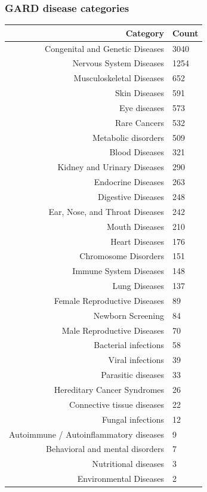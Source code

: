 ﻿\documentclass[anchorcolor=blue,linkcolor=blue]{beamer}
\begin{document}
\begin{frame}
  \frametitle{GARD disease categories}
  \begin{center}
    \tiny
    \begin{tabular}{rl}\toprule
      Category & Count\\ \midrule
      Congenital and Genetic Diseases&3040\\
      Nervous System Diseases&1254\\
      Musculoskeletal Diseases&652\\
      Skin Diseases&591\\
      Eye diseases&573\\
      Rare Cancers&532\\
      Metabolic disorders&509\\
      Blood Diseases&321\\
      Kidney and Urinary Diseases&290\\
      Endocrine Diseases&263\\
      Digestive Diseases&248\\
      Ear, Nose, and Throat Diseases&242\\
      Mouth Diseases&210\\
      Heart Diseases&176\\
      Chromosome Disorders&151\\
      Immune System Diseases&148\\
      Lung Diseases&137\\
      Female Reproductive Diseases&89\\
      Newborn Screening&84\\
      Male Reproductive Diseases&70\\
      Bacterial infections&58\\
      Viral infections&39\\
      Parasitic diseases&33\\
      Hereditary Cancer Syndromes&26\\
      Connective tissue diseases&22\\
      Fungal infections&12\\
      Autoimmune / Autoinflammatory diseases&9\\
      Behavioral and mental disorders&7\\
      Nutritional diseases&3\\
      Environmental Diseases&2        \\ \bottomrule
    \end{tabular}
  \end{center}
\end{frame}
\end{document}
